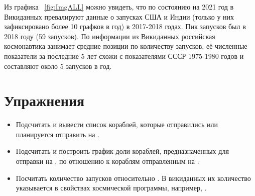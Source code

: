 
Из графика ~\ref{fig:ImgALL} можно увидеть, что по состоянию на 2021 год в Викиданных превалируют данные о запусках США и Индии (только у них зафиксировано более 10 графков в год) в 2017-2018 годах. Пик запусков был в 2018 году (59 запусков). По информации из Викиданных российская космонавтика занимает средние позиции по количеству запусков, её численные показатели за последние 5 лет схожи с показателями СССР 1975-1980 годов и составляют около 5 запусков в год.

\section{Упражнения}
\begin{itemize}
  \item Подсчитать и вывести список кораблей, которые отправились или планируется отправить на .
  \item Подсчитать и построить график доли кораблей, предназначенных для отправки на , по отношению к кораблям отправленным на .
  \item Посчитать количество  запусков относительно . В викиданных их количество указывается в свойствах космической программы, например, . 
\end{itemize}
